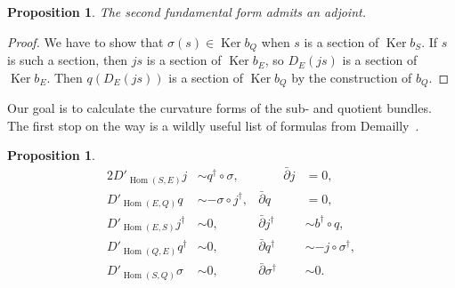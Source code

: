 \documentclass[10pt,a4paper]{amsart}
\newtheorem{prop}[theo]{Proposition}
\theoremstyle{definition}
\DeclareMathOperator{\Ker}{Ker}
\DeclareMathOperator{\Hom}{Hom}
\def\snd{\sigma}
\begin{document}
\begin{prop}
The second fundamental form admits an adjoint.
\end{prop}

\begin{proof}
We have to show that $\snd(s) \in \Ker b_Q$ when $s$ is a section of $\Ker b_S$. If $s$ is such a section, then $js$ is a section of $\Ker b_E$, so $D_E(js)$ is a section of $\Ker b_E$. Then $q(D_E(js))$ is a section of $\Ker b_Q$ by the construction of $b_Q$.
\end{proof}



Our goal is to calculate the curvature forms of the sub- and quotient bundles. The first stop on the way is a wildly useful list of formulas from Demailly~{{\cite[Theorem~14.3]{demailly-complex}}}.


\begin{prop}
\label{prop:seq-formulas}
\begin{alignat*}{2}
D'_{\Hom(S,E)}j &\sim q^\dagger \circ \snd,
&
\qquad
\bar\partial j &= 0,
\\
D'_{\Hom(E, Q)} q &\sim - \snd \circ j^\dagger,
&
\bar\partial q &= 0,
\\
D'_{\Hom(E,S)} j^\dagger &\sim 0,
&
\bar\partial j^\dagger &\sim b^\dagger \circ q,
\\
D'_{\Hom(Q,E)} q^\dagger &\sim 0,
&
\bar\partial q^\dagger &\sim - j \circ \snd^\dagger,
\\
D'_{\Hom(S,Q)} \snd &\sim 0,
&
\bar\partial \snd^\dagger &\sim 0.
\end{alignat*}
\end{prop}
\end{document}
